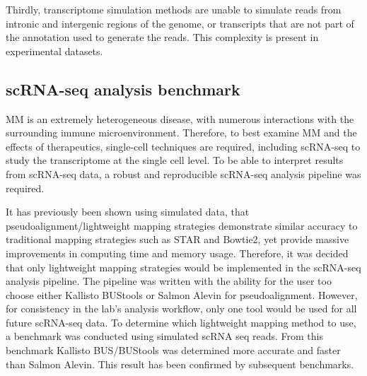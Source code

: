 Thirdly, transcriptome simulation methods are unable to simulate reads from intronic and intergenic regions of the genome, or transcripts that are not part of the annotation used to generate the reads.
This complexity is present in experimental datasets.


\subsection{scRNA-seq analysis benchmark}
MM is an extremely heterogeneous disease, with numerous interactions with the surrounding immune microenvironment.
Therefore, to best examine MM and the effects of therapeutics, single-cell techniques are required, including scRNA-seq to study the transcriptome at the single cell level.
To be able to interpret results from scRNA-seq data, a robust and reproducible scRNA-seq analysis pipeline was required.

It has previously been shown using simulated data, that pseudoalignment/lightweight mapping strategies demonstrate similar accuracy to traditional mapping strategies such as STAR and Bowtie2, yet provide massive improvements in computing time and memory usage.
Therefore, it was decided that only lightweight mapping strategies would be implemented in the scRNA-seq analysis pipeline.
The pipeline was written with the ability for the user too choose either Kallisto BUStools or Salmon Alevin for pseudoalignment.
However, for consistency in the lab's analysis workflow, only one tool would be used for all future scRNA-seq data.
To determine which lightweight mapping method to use, a benchmark was conducted using simulated scRNA seq reads.
From this benchmark Kallisto BUS/BUStools was determined more accurate and faster than Salmon Alevin.
This result has been confirmed by subsequent benchmarks\cite{you2021benchmarking, melsted2019modular, melsted2019barcode}.

